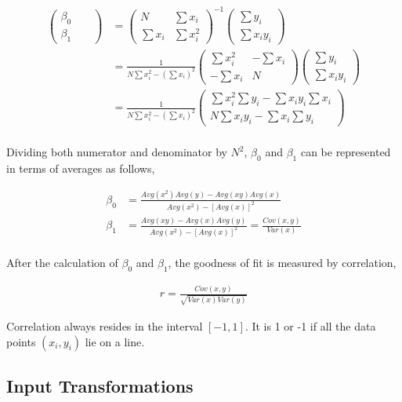 \documentclass[11pt, a4paper]{article}
\begin{document}
\begin{align*}
	\begin{pmatrix} \beta_0 &   &   \\ \beta_1 \end{pmatrix} &= \begin{pmatrix} N & \sum x_i \\ \sum x_i & \sum x_i^2 \end{pmatrix}^{-1} \begin{pmatrix}
	\sum y_i \\ \sum x_iy_i \end{pmatrix} \\
	& = \frac{1}{N\sum x_i^2 - (\sum x_i)^2} \begin{pmatrix} \sum x_i^2 & -\sum x_i \\ -\sum x_i & N \end{pmatrix} \begin{pmatrix}
	\sum y_i \\ \sum x_iy_i \end{pmatrix} \\
	&= \frac{1}{N\sum x_i^2 - (\sum x_i)^2} \begin{pmatrix}
	\sum x_i^2 \sum y_i -\sum x_iy_i  \sum x_i  \\ N \sum x_i y_i - \sum x_i \sum y_i \end{pmatrix} \\
\end{align*}

Dividing both numerator and denominator by $N^2$, $\beta_0$ and $\beta_1$ can be represented in terms of averages as follows, 

\begin{align*}
	\beta_0 & = \frac{Avg(x^2)Avg(y) - Avg(xy)Avg(x)}{Avg(x^2) - [Avg(x)]^2}                    \\
	\beta_1 & = \frac{Avg(xy) - Avg(x)Avg(y)}{Avg(x^2) - [Avg(x)]^2} = \frac{Cov(x, y)}{Var(x)} \\
\end{align*}

After the calculation of $\beta_0$ and $\beta_1$, the goodness of fit is measured by correlation,

\begin{align*}
	r = \frac{Cov(x, y)}{\sqrt{Var(x)Var(y)}} 
\end{align*}

Correlation always resides in the interval $[-1, 1]$. It is 1 or -1 if all the data points $(x_i, y_i)$ lie on a line.

\subsection{Input Transformations}
\end{document}

